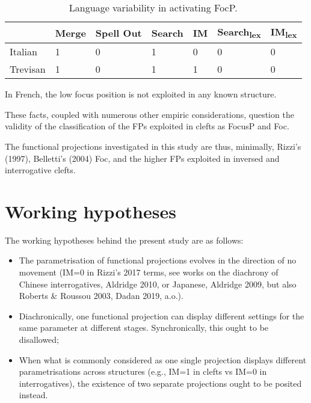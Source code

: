 \documentclass[fleqn,10pt]{wlscirep}
\begin{document}
\begin{table}[ht]
    \centering
    \begin{tabular}{|l|l|l|l|l|l|l|}
    \hline
     & Merge & Spell Out & Search & IM & Search\textsubscript{lex} & IM\textsubscript{lex} \\
    \hline
    Italian & 1 & 0 & 1 & 0 & 0 & 0 \\
    \hline
    Trevisan & 1 & 0 & 1 & 1 & 0 & 0\\
    \hline
    \end{tabular}
    \caption{\label{tab:samp2}Language variability in activating FocP.}
    \end{table}

In French, the low focus position is not exploited in any known structure. 

These facts, coupled with numerous other empiric considerations, question the validity of the classification of the FPs exploited in clefts as FocusP and Foc. 

The functional projections investigated in this study are thus, minimally, Rizzi’s (1997), Belletti’s (2004) Foc, and the higher FPs exploited in inversed and interrogative clefts.

\begin{exe}
    \ex 
\end{exe}

\section*{Working hypotheses}
The working hypotheses behind the present study are as follows:

\begin{itemize}
\item The parametrisation of functional projections evolves in the direction of no movement (IM=0 in Rizzi’s 2017 terms, see works on the diachrony of Chinese interrogatives, Aldridge 2010, or Japanese, Aldridge 2009, but also Roberts & Roussou 2003, Dadan 2019, a.o.).
\item Diachronically, one functional projection can display different settings for the same parameter at different stages. Synchronically, this ought to be disallowed;
\item When what is commonly considered as one single projection displays different parametrisations across structures (e.g., IM=1 in clefts vs IM=0 in interrogatives), the existence of two separate projections ought to be posited instead.
\end{itemize}
\end{document}

